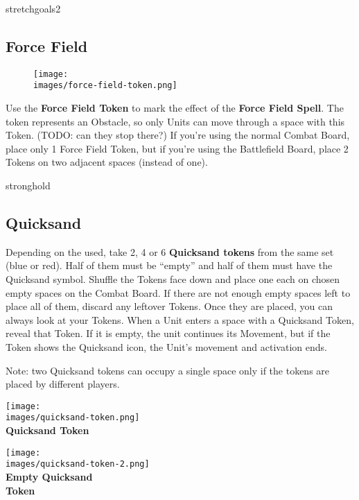 \begin{multicols}{2}
\begin{expansion}{stretchgoals2}
    \subsection*{Force Field}
    \setlength\intextsep{0pt}
    \setlength\columnsep{1em}
    \begin{wrapfigure}{r}{0.2\linewidth}
        \texttt{[image: \\images/force-field-token.png]}
    \end{wrapfigure}
    Use the \textbf{Force Field Token} to mark the effect of the \textbf{Force Field Spell}.
    The token represents an Obstacle, so only  Units can move through a space with this Token. (TODO: can they stop there?)
    If you're using the normal Combat Board, place only 1 Force Field Token, but if you're using the Battlefield Board, place 2 Tokens on two adjacent spaces (instead of one).
\end{expansion}

\vspace*{1em}
\begin{expansion}{stronghold}
    \subsection*{Quicksand}
    Depending on the  used, take 2, 4 or 6 \textbf{Quicksand tokens} from the same set (blue or red).
    Half of them must be ``empty'' and half of them must have the Quicksand symbol.
    Shuffle the Tokens face down and place one each on chosen empty spaces on the Combat Board.
    If there are not enough empty spaces left to place all of them, discard any leftover Tokens.
    Once they are placed, you can always look at your Tokens.
    When a Unit enters a space with a Quicksand Token, reveal that Token.
    If it is empty, the unit continues its Movement, but if the Token shows the Quicksand icon, the Unit's movement and activation ends.

    Note: two Quicksand tokens can occupy a single space only if the tokens are placed by different players.
    \bigskip
    \begin{multicols*}{2}
        \centering
        \texttt{[image: \\images/quicksand-token.png]}\\
        \textbf{\scriptsize\color{darkcandyapplered}Quicksand Token\\}

        \columnbreak
        \texttt{[image: \\images/quicksand-token-2.png]}\\
        \textbf{\scriptsize\color{darkcandyapplered}Empty Quicksand\\Token\\}
    \end{multicols*}
\end{expansion}


\end{multicols}
